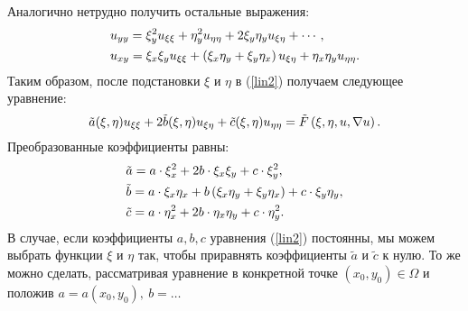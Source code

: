     Аналогично нетрудно получить остальные выражения:
    \begin{align*}
        & u_{yy} = \xi_y^2 u_{\xi\xi} + \eta_y^2 u_{\eta\eta} + 2 \xi_y\eta_y u_{\xi\eta} + \cdots,\\
        & u_{xy} = \xi_x\xi_y u_{\xi\xi} + \left({\xi_x\eta_y + \xi_y\eta_x}\right)u_{\xi\eta} + \eta_x\eta_yu_{\eta\eta}.
    \end{align*}
    Таким образом, после подстановки $\xi$ и $\eta$ в (\ref{lin2}) получаем следующее уравнение:
    \begin{equation*}
        \tilde{a}(\xi, \eta) u_{\xi\xi} + 2\tilde{b}(\xi, \eta)u_{\xi\eta} + \tilde{c}(\xi, \eta)u_{\eta\eta} = \tilde{F}\left({\xi, \eta, u, \nabla u}\right).
    \end{equation*}
    Преобразованные коэффициенты равны:
    \begin{align*}
        & \tilde{a} = a\cdot\xi_x^2 + 2b\cdot\xi_x\xi_y + c\cdot\xi_y^2,\\
        & \tilde{b} = a\cdot\xi_x\eta_x + b\left({\xi_x\eta_y +\xi_y\eta_x}\right) + c\cdot\xi_y\eta_y,\\
        & \tilde{c} = a\cdot\eta_x^2 + 2b\cdot\eta_x\eta_y + c\cdot\eta_y^2.
    \end{align*}
    В случае, если коэффициенты $a, b, c$ уравнения (\ref{lin2}) постоянны, мы можем выбрать функции $\xi$ и $\eta$ так, чтобы приравнять коэффициенты
    $\tilde{a}$ и $\tilde{c}$ к нулю. То же можно сделать, рассматривая уравнение в конкретной точке $(x_0, y_0) \in \Omega$ и положив
    $a = a(x_0,y_0),\: b = \ldots$